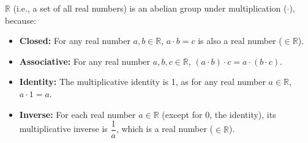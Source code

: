 \noindent $\mathbb{R}$ (i.e., a set of all real numbers) is an abelian group under multiplication ($\cdot$), because: 
\begin{itemize}
\item \textbf{Closed:} For any real number $a, b \in \mathbb{R}$, $a \cdot b = c$ is also a real number ($\in \mathbb{R}$).
\item \textbf{Associative:} For any real number $a, b, c \in \mathbb{R}$, $(a \cdot b) \cdot c = a \cdot (b \cdot c)$.
\item \textbf{Identity:} The multiplicative identity is 1, as for any real number $a \in \mathbb{R}$, $a \cdot 1 = a$.
\item \textbf{Inverse:} For each real number $a \in \mathbb{R}$ (except for 0, the identity), its multiplicative inverse is $\dfrac{1}{a}$, which is a real number ($\in \mathbb{R}$).
\end{itemize}